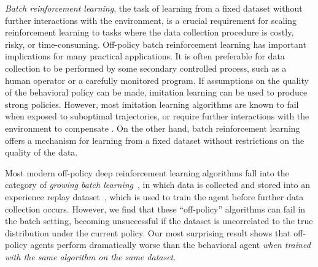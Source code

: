 \documentclass{article}
\begin{document}
\textit{Batch reinforcement learning}, the task of learning from a fixed dataset without further interactions with the environment, is a crucial requirement for scaling reinforcement learning to tasks where the data collection procedure is costly, risky, or time-consuming. 
Off-policy batch reinforcement learning has important implications for many practical applications. It is often preferable for data collection to be performed by some secondary controlled process, such as a human operator or a carefully monitored program. If assumptions on the quality of the behavioral policy can be made, imitation learning can be used to produce strong policies. However, most imitation learning algorithms are known to fail when exposed to suboptimal trajectories, or require further interactions with the environment to compensate \cite{hester2017deep, sun2018truncated, cheng2018fast}. 
On the other hand, batch reinforcement learning offers a mechanism for learning from a fixed dataset without restrictions on the quality of the data.

Most modern off-policy deep reinforcement learning algorithms fall into the category of \textit{growing batch learning}~\citep{lange2012batch}, in which data is collected and stored into an experience replay dataset~\citep{expreplay1992}, which is used to train the agent before further data collection occurs. However, we find that these ``off-policy'' algorithms can fail in the batch setting, becoming unsuccessful if the dataset is uncorrelated to the true distribution under the current policy. Our most surprising result shows that off-policy agents perform dramatically worse than the behavioral agent \textit{when trained with the same algorithm on the same dataset}.
\end{document}
